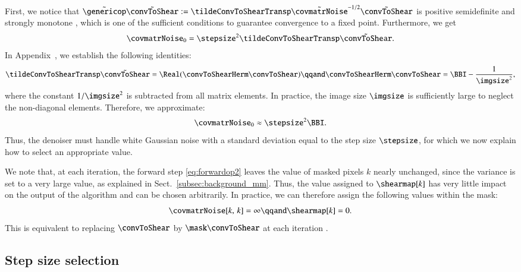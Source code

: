 \documentclass{aa}
\begin{document}
First, we notice that $\tilde\genericop\tilde\convToShear := \tildeConvToShearTransp\tilde\covmatrNoise^{-1/2}\tilde\convToShear$ is positive semidefinite and strongly monotone \tocheck, which is one of the sufficient conditions to guarantee convergence to a fixed point. Furthermore, we get
\begin{equation}
    \covmatrNoise_0 = \stepsize^2\tildeConvToShearTransp\tilde\convToShear.
\end{equation}
In Appendix~\todo, we establish the following identities:
\begin{equation}
    \tildeConvToShearTransp\tilde\convToShear = \Real(\convToShearHerm\convToShear) \qqand \convToShearHerm\convToShear = \BBI - \frac1{\imgsize^2},
\end{equation}
where the constant $1 / \imgsize^2$ is subtracted from all matrix elements. In practice, the image size $\imgsize$ is sufficiently large to neglect the non-diagonal elements. Therefore, we approximate:%
\begin{equation}
    \covmatrNoise_0 \approx \stepsize^2 \BBI.
\label{eq:covmatrwhitenoise}
\end{equation}
Thus, the denoiser must handle white Gaussian noise with a standard deviation equal to the step size $\stepsize$, for which we now explain how to select an appropriate value.

We note that, at each iteration, the forward step \eqref{eq:forwardop2} leaves the value of masked pixels $k$ nearly unchanged, since the variance is set to a very large value, as explained in Sect.~\ref{subsec:background_mm}. Thus, the value assigned to $\shearmap[k]$ has very little impact on the output of the algorithm and can be chosen arbitrarily. In practice, we can therefore assign the following values within the mask:
\begin{equation}
    \covmatrNoise[k,\, k] = \infty \qqand \shearmap[k] = 0.
\label{eq:maskedpixels}
\end{equation}
This is equivalent to replacing $\convToShear$ by $\mask\convToShear$ at each iteration \todo[unclear].

\subsection{Step size selection}
\label{subsec:pnp_stepsize}
\end{document}
